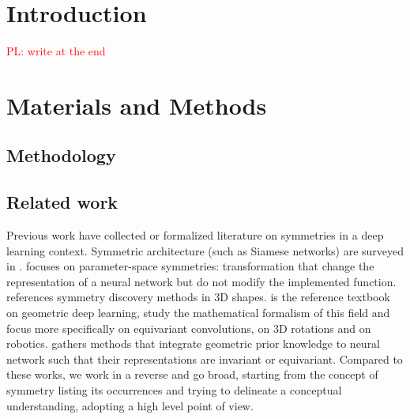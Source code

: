 \documentclass[mathematics,review,submit,moreauthors]{Definitions/mdpi}
\newcommand{\pnote}[1]{\textcolor{red}{PL: #1}}
\begin{document}
\section{Introduction}

\pnote{write at the end}

\section{Materials and Methods}

\subsection{Methodology}

\subsection{Related work}
Previous work have collected or formalized literature on symmetries in a deep learning context.
Symmetric architecture (such as Siamese networks) are surveyed in \cite{ilina2022sa}.
\cite{zhao2025} focuses on parameter-space symmetries: transformation that change the representation of a neural network but do not modify the implemented function.
\cite{sipiran202523scgpis} references symmetry discovery methods in 3D shapes.
\cite{bronstein2021} is the reference textbook on geometric deep learning,  \cite{gerken2021,carlsson} study the mathematical formalism of this field and \cite{basheer2025ijdsa,habte2023} focus more specifically on equivariant convolutions, \cite{fei2024air} on 3D rotations and \cite{seo2025a} on robotics.
\cite{rath2024air} gathers methods that integrate geometric prior knowledge to neural network such that their representations are invariant or equivariant.
Compared to these works, we work in a reverse and go broad, starting from the concept of symmetry listing its occurrences and trying to delineate a conceptual understanding, adopting a high level point of view.
\end{document}
